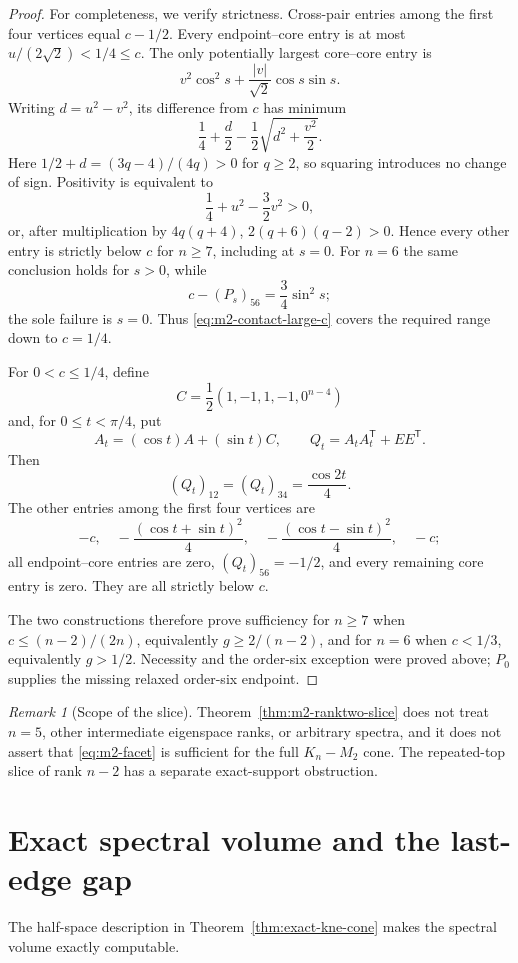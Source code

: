 \documentclass[11pt,reqno]{amsart}
\theoremstyle{definition}
\theoremstyle{remark}
\newtheorem{remark}[theorem]{Remark}
\begin{document}
\begin{proof}
For completeness, we verify strictness.  Cross-pair entries among the first
four vertices equal $c-1/2$.  Every endpoint--core entry is at most
$u/(2\sqrt2)<1/4\le c$.  The only potentially largest core--core entry is
\[
 v^2\cos^2s+\frac{|v|}{\sqrt2}\cos s\sin s.
\]
Writing $d=u^2-v^2$, its difference from $c$ has minimum
\[
 \frac14+\frac d2-\frac12\sqrt{d^2+\frac{v^2}{2}}.
\]
Here $1/2+d=(3q-4)/(4q)>0$ for $q\ge2$, so squaring introduces no change
of sign.  Positivity is equivalent to
\[
 \frac14+u^2-\frac32v^2>0,
\]
or, after multiplication by $4q(q+4)$,
$2(q+6)(q-2)>0$.  Hence every other entry is strictly below $c$ for
$n\ge7$, including at $s=0$.  For $n=6$ the same conclusion holds for
$s>0$, while
\[
 c-(P_s)_{56}=\frac34\sin^2s;
\]
the sole failure is $s=0$.  Thus \eqref{eq:m2-contact-large-c} covers the
required range down to $c=1/4$.

For $0<c\le1/4$, define
\[
 C=\frac12(1,-1,1,-1,0^{n-4})
\]
and, for $0\le t<\pi/4$, put
\[
 A_t=(\cos t)A+(\sin t)C,\qquad
 Q_t=A_tA_t^{\mathsf T}+EE^{\mathsf T}.
\]
Then
\[
 (Q_t)_{12}=(Q_t)_{34}=\frac{\cos2t}{4}.
\]
The other entries among the first four vertices are
\[
 -c,\quad-\frac{(\cos t+\sin t)^2}{4},\quad
 -\frac{(\cos t-\sin t)^2}{4},\quad-c;
\]
all endpoint--core entries are zero, $(Q_t)_{56}=-1/2$, and every remaining
core entry is zero.  They are all strictly below $c$.

The two constructions therefore prove sufficiency for $n\ge7$ when
$c\le(n-2)/(2n)$, equivalently $g\ge2/(n-2)$, and for $n=6$ when
$c<1/3$, equivalently $g>1/2$.  Necessity and the order-six exception were
proved above; $P_0$ supplies the missing relaxed order-six endpoint.
\end{proof}

\begin{remark}[Scope of the slice]
Theorem~\ref{thm:m2-ranktwo-slice} does not treat $n=5$, other intermediate
eigenspace ranks, or arbitrary spectra, and it does not assert that
\eqref{eq:m2-facet} is sufficient for the full $K_n-M_2$ cone.  The
repeated-top slice of rank $n-2$ has a separate exact-support obstruction.
\end{remark}

\section{Exact spectral volume and the last-edge gap}\label{sec:volume}

The half-space description in Theorem~\ref{thm:exact-kne-cone} makes the
spectral volume exactly computable.
\end{document}
